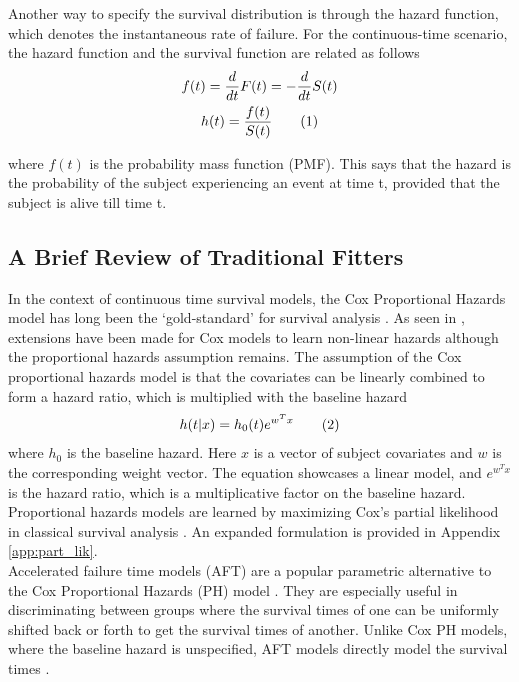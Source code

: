 \documentclass[%
 twocolumn,
 reprint,
 amsmath,amssymb,
 aps,nofootinbib
]{revtex4-2}
\newcommand\numberthis{\addtocounter{equation}{1}\tag{\theequation}} %
\begin{document}
Another way to specify the survival distribution is through the hazard function, which denotes the instantaneous rate of failure. For the continuous-time scenario, the hazard function and the survival function are related as follows 
\begin{gather*}
f(t) = \frac{d}{dt}F(t) = -\frac{d}{dt}S(t)\\
h(t) = \frac{f(t)}{S(t)} \numberthis \label{eq:haz_pmf_surv}
\end{gather*}

where $f(t)$ is the probability mass function (PMF). This says that the hazard is the probability of the subject experiencing an event at time t, provided that the subject is alive till time t. \\

\subsection{\label{trad_fits}A Brief Review of Traditional Fitters}
In the context of continuous time survival models, the Cox Proportional Hazards model has long been the `gold-standard' for survival analysis \cite{cph}. As seen in \cite{deepsurv}, extensions have been made for Cox models to learn non-linear hazards although the proportional hazards assumption remains. The assumption of the Cox proportional hazards model is that the covariates can be linearly combined to form a hazard ratio, which is multiplied with the baseline hazard
\begin{gather*}
h(t|x) = h_0(t)e^{w^Tx} \numberthis  \label{eq:prop_haz}
\end{gather*}
where $h_0$ is the baseline hazard. Here $x$ is a vector of subject covariates and $w$ is the corresponding weight vector. The equation showcases a linear model, and $e^{w^Tx}$ is the hazard ratio, which is a multiplicative factor on the baseline hazard. Proportional hazards models are learned by maximizing Cox’s partial likelihood in classical survival analysis \cite{raykar_cindex}. An expanded formulation is provided in Appendix \ref{app:part_lik}.\\

Accelerated failure time models (AFT) are a popular parametric alternative to the Cox Proportional Hazards (PH) model \cite{aft}. They are especially useful in discriminating between groups where the survival times of one can be uniformly shifted back or forth to get the survival times of another. Unlike Cox PH models, where the baseline hazard is unspecified, AFT models directly model the survival times \cite{aft_2009}.\\
\end{document}
